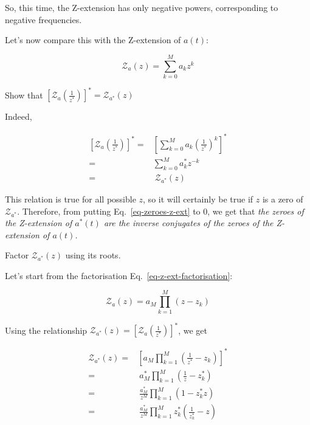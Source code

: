 So, this time, the Z-extension has only negative powers, corresponding to negative frequencies.

Let's now compare this with the Z-extension of $a(t)$:

\begin{equation}
\mathcal{Z}_a(z) = \sum_{k=0}^{M} a_k z^k
\end{equation}

\begin{cue}
Show that $\left[\mathcal{Z}_a\left(\frac{1}{z^*}\right)\right]^* = \mathcal{Z}_{a^*}(z)$
\end{cue}
    
Indeed, 

\begin{align}
    \left[\mathcal{Z}_a\left(\frac{1}{z^*}\right)\right]^* =& \left[ \sum_{k=0}^{M} a_k \left(\frac{1}{z^*}\right)^k \right]^* \nonumber \\
    =& \sum_{k=0}^{M} a_k^* z^{-k} \nonumber \\
    =& \ \mathcal{Z}_{a^*}(z)
    \label{eq-zeroes-z-ext}
\end{align}

This relation is true for all possible $z$, so it will certainly be true if $z$ is a zero of $\mathcal{Z}_{a^*}$. Therefore, from putting Eq.~\ref{eq-zeroes-z-ext} to 0, we get that \emph{the zeroes of the Z-extension of $a^*(t)$ are the inverse conjugates of the zeroes of the Z-extension of $a(t)$. }

\begin{cue}
Factor $\mathcal{Z}_{a^*}(z)$ using its roots.
\end{cue}

Let's start from the factorisation Eq.~\ref{eq-z-ext-factorisation}:

\begin{equation}
\mathcal{Z}_a(z) = a_M \prod_{k=1}^{M} (z-z_k)
\end{equation}

Using the relationship  $\mathcal{Z}_{a^*}(z) = \left[\mathcal{Z}_a\left(\frac{1}{z^*}\right)\right]^*$, we get

\begin{align}
    \mathcal{Z}_{a^*}(z) =& \left[ a_M \prod_{k=1}^{M} \left(\frac{1}{z^*}-z_k \right) \right]^* \nonumber \\
    =& \ a_M^* \prod_{k=1}^{M} \left(\frac{1}{z}-z_k^* \right) \nonumber \\
    =& \ \frac{a_M^*}{z^M} \prod_{k=1}^{M} \left(1 - z_k^* z \right) \nonumber \\
    =& \ \frac{a_M^*}{z^M} \prod_{k=1}^{M} z_k^* \left(\frac{1}{z_k^*} - z \right) 
\end{align}

